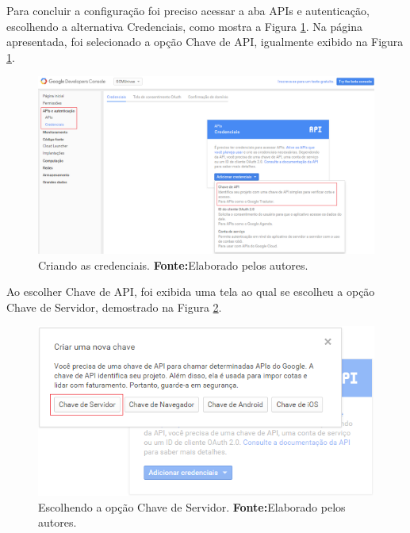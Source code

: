 	\pagebreak
	
	\par Para concluir a configuração foi preciso acessar a aba APIs e
autenticação, escolhendo a alternativa Credenciais, como mostra a Figura
\ref{fig:gcm6}. Na página apresentada, foi selecionado a opção Chave de API,
igualmente exibido na Figura \ref{fig:gcm6}.
	
	\begin{figure}[h!] 
		\centerline{\includegraphics[scale=0.4]{./imagens/2_q_metodologico/4_procedimentos_resultados/41_gcm/gcm6.png}}
		\caption[Criando as credenciais]{Criando as credenciais.
		\textbf{Fonte:}Elaborado pelos autores.}
		\label{fig:gcm6}
	\end{figure}
	
	\pagebreak
	
	\par Ao escolher Chave de API, foi exibida uma tela ao qual se escolheu a opção
Chave de Servidor, demostrado na Figura \ref{fig:gcm7}.
	
	\begin{figure}[h!] 
		\centerline{\includegraphics[scale=.8]{./imagens/2_q_metodologico/4_procedimentos_resultados/41_gcm/gcm7.png}}
		\caption[Escolhendo a opção Chave de Servidor]{Escolhendo a opção Chave de
		Servidor.
		\textbf{Fonte:}Elaborado pelos autores.}
		\label{fig:gcm7}
	\end{figure}
	
